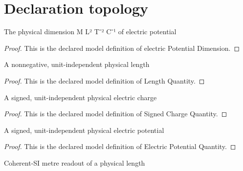 \section{Declaration topology}
\begin{definition}
  \label{def:physics:phyx-mini-0859:phyxminiproblems-problemphyxmini0859-electricpotentialdimension}
  The physical dimension M L² T⁻² C⁻¹ of electric potential
\end{definition}
\begin{proof}
  This is the declared model definition of electric Potential Dimension.
\end{proof}
\begin{definition}
  \label{def:physics:phyx-mini-0859:phyxminiproblems-problemphyxmini0859-lengthquantity}
  A nonnegative, unit-independent physical length
\end{definition}
\begin{proof}
  This is the declared model definition of Length Quantity.
\end{proof}
\begin{definition}
  \label{def:physics:phyx-mini-0859:phyxminiproblems-problemphyxmini0859-signedchargequantity}
  A signed, unit-independent physical electric charge
\end{definition}
\begin{proof}
  This is the declared model definition of Signed Charge Quantity.
\end{proof}
\begin{definition}
  \label{def:physics:phyx-mini-0859:phyxminiproblems-problemphyxmini0859-electricpotentialquantity}
  A signed, unit-independent physical electric potential
\end{definition}
\begin{proof}
  This is the declared model definition of Electric Potential Quantity.
\end{proof}
\begin{definition}
  \label{def:physics:phyx-mini-0859:phyxminiproblems-problemphyxmini0859-lengthinmeters}
  Coherent-SI metre readout of a physical length
\end{definition}
